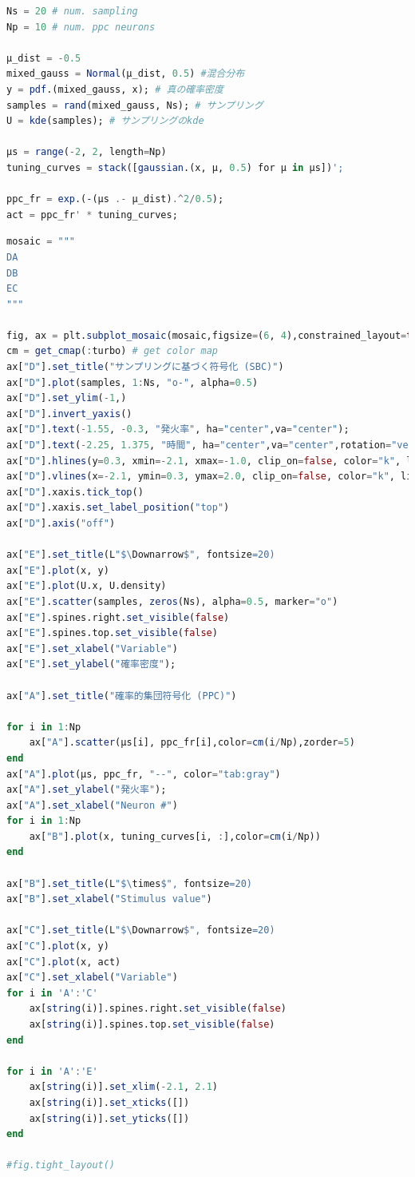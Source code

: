 \begin{lstlisting}[language=julia]
Ns = 20 # num. sampling
Np = 10 # num. ppc neurons

μ_dist = -0.5
mixed_gauss = Normal(μ_dist, 0.5) #混合分布
y = pdf.(mixed_gauss, x); # 真の確率密度
samples = rand(mixed_gauss, Ns); # サンプリング
U = kde(samples); # サンプリングのkde

μs = range(-2, 2, length=Np)
tuning_curves = stack([gaussian.(x, μ, 0.5) for μ in μs])';

ppc_fr = exp.(-(μs .- μ_dist).^2/0.5);
act = ppc_fr' * tuning_curves;
\end{lstlisting}
\begin{lstlisting}[language=julia]
mosaic = """
DA
DB
EC
"""

fig, ax = plt.subplot_mosaic(mosaic,figsize=(6, 4),constrained_layout=true)
cm = get_cmap(:turbo) # get color map
ax["D"].set_title("サンプリングに基づく符号化 (SBC)")
ax["D"].plot(samples, 1:Ns, "o-", alpha=0.5)
ax["D"].set_ylim(-1,)
ax["D"].invert_yaxis()
ax["D"].text(-1.55, -0.3, "発火率", ha="center",va="center"); 
ax["D"].text(-2.25, 1.375, "時間", ha="center",va="center",rotation="vertical")
ax["D"].hlines(y=0.3, xmin=-2.1, xmax=-1.0, clip_on=false, color="k", linewidths=1)
ax["D"].vlines(x=-2.1, ymin=0.3, ymax=2.0, clip_on=false, color="k", linewidths=1)
ax["D"].xaxis.tick_top()
ax["D"].xaxis.set_label_position("top") 
ax["D"].axis("off")

ax["E"].set_title(L"$\Downarrow$", fontsize=20)
ax["E"].plot(x, y)
ax["E"].plot(U.x, U.density)
ax["E"].scatter(samples, zeros(Ns), alpha=0.5, marker="o")
ax["E"].spines.right.set_visible(false)
ax["E"].spines.top.set_visible(false)
ax["E"].set_xlabel("Variable")
ax["E"].set_ylabel("確率密度");

ax["A"].set_title("確率的集団符号化 (PPC)")

for i in 1:Np
    ax["A"].scatter(μs[i], ppc_fr[i],color=cm(i/Np),zorder=5)
end
ax["A"].plot(μs, ppc_fr, "--", color="tab:gray")
ax["A"].set_ylabel("発火率"); 
ax["A"].set_xlabel("Neuron #")
for i in 1:Np
    ax["B"].plot(x, tuning_curves[i, :],color=cm(i/Np))
end

ax["B"].set_title(L"$\times$", fontsize=20)
ax["B"].set_xlabel("Stimulus value")

ax["C"].set_title(L"$\Downarrow$", fontsize=20)
ax["C"].plot(x, y)
ax["C"].plot(x, act)
ax["C"].set_xlabel("Variable")
for i in 'A':'C'
    ax[string(i)].spines.right.set_visible(false)
    ax[string(i)].spines.top.set_visible(false)
end

for i in 'A':'E'
    ax[string(i)].set_xlim(-2.1, 2.1)
    ax[string(i)].set_xticks([])
    ax[string(i)].set_yticks([])
end

#fig.tight_layout()
\end{lstlisting}
